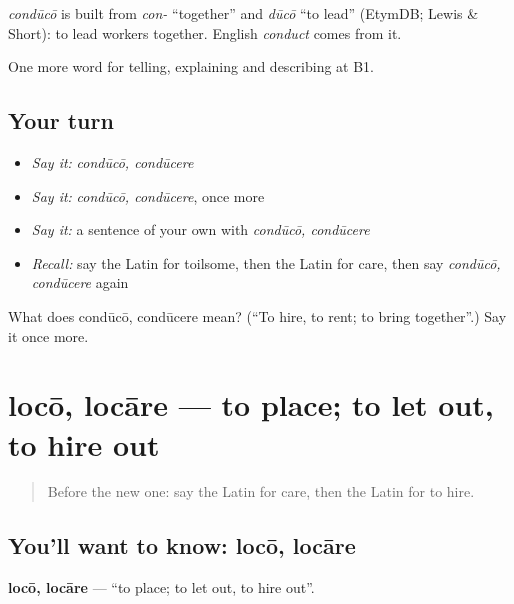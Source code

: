 \begin{cousinweb}
\emph{condūcō} is built from \emph{con-} \textquotedblleft{}together\textquotedblright{} and \emph{dūcō} \textquotedblleft{}to lead\textquotedblright{} (EtymDB; Lewis \& Short): to lead workers together. English \emph{conduct} comes from it.
\end{cousinweb}

\begin{grammarlens}[title={What you've built}]
One more word for telling, explaining and describing at B1.
\end{grammarlens}

\subsection*{Your turn}
\begin{itemize}
\raggedright
  \item \emph{Say it:} \emph{condūcō, condūcere}
  \item \emph{Say it:} \emph{condūcō, condūcere}, once more
  \item \emph{Say it:} a sentence of your own with \emph{condūcō, condūcere}
  \item \emph{Recall:} say the Latin for toilsome, then the Latin for care, then say \emph{condūcō, condūcere} again
\end{itemize}

\begin{tcolorbox}[breakable,colback=teal!4,colframe=teal!35!black,title={Before you move on}]
What does condūcō, condūcere mean? (\textquotedblleft{}To hire, to rent; to bring together\textquotedblright{}.) Say it once more.
\end{tcolorbox}
\section[locō, locāre]{locō, locāre — to place; to let out, to hire out}

\label{lesson:LA-C380-loco}



\begin{quote}
Before the new one: say the Latin for care, then the Latin for to hire.
\end{quote}

\subsection*{You'll want to know: locō, locāre}
\textbf{locō, locāre} — \textquotedblleft{}to place; to let out, to hire out\textquotedblright{}.

